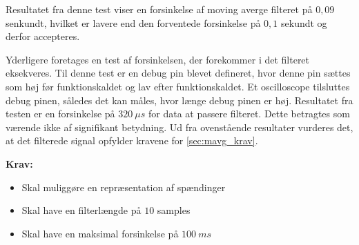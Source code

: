 Resultatet fra denne test viser en forsinkelse af moving averge filteret på $0,09$ senkundt, hvilket er lavere end den forventede forsinkelse på $0,1$ sekundt og derfor accepteres. 

Yderligere foretages en test af forsinkelsen, der forekommer i det filteret eksekveres. Til denne test er en debug pin blevet defineret, hvor denne pin sættes som høj før funktionskaldet og lav efter funktionskaldet. Et oscilloscope tilsluttes debug pinen, således det kan måles, hvor længe debug pinen er høj. Resultatet fra testen er en forsinkelse på $320~\mu s$ for data at passere filteret. Dette betragtes som værende ikke af signifikant betydning.    
Ud fra ovenstående resultater vurderes det, at det filterede signal opfylder kravene for \autoref{sec:mavg_krav}. 


\vspace{3mm}
\textbf{Krav:}
\begin{itemize}
\item[\text{\sffamily \checkmark}] Skal muliggøre en repræsentation af spændinger 
\item[\text{\sffamily \checkmark}] Skal have en filterlængde på $10$ samples
\item[\text{\sffamily \checkmark}] Skal have en maksimal forsinkelse på $100~ms$
\end{itemize}